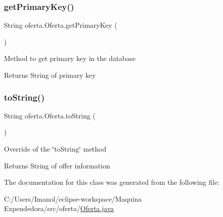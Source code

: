 \subsubsection{\texorpdfstring{get\+Primary\+Key()}{getPrimaryKey()}}
{\footnotesize\ttfamily String oferta.\+Oferta.\+get\+Primary\+Key (\begin{DoxyParamCaption}{ }\end{DoxyParamCaption})}

Method to get primary key in the database

\begin{DoxyReturn}{Returns}
String of primary key 
\end{DoxyReturn}
\mbox{\label{classoferta_1_1_oferta_af4be574b1f0db93797a0a2fea7db2b07}} 
\subsubsection{\texorpdfstring{to\+String()}{toString()}}
{\footnotesize\ttfamily String oferta.\+Oferta.\+to\+String (\begin{DoxyParamCaption}{ }\end{DoxyParamCaption})}

Override of the \char`\"{}to\+String\char`\"{} method \begin{DoxyReturn}{Returns}
String of offer information 
\end{DoxyReturn}


The documentation for this class was generated from the following file\+:\begin{DoxyCompactItemize}
\item 
C\+:/\+Users/\+Imanol/eclipse-\/workspace/\+Maquina Expendedora/src/oferta/\mbox{\hyperlink{_oferta_8java}{Oferta.\+java}}\end{DoxyCompactItemize}
